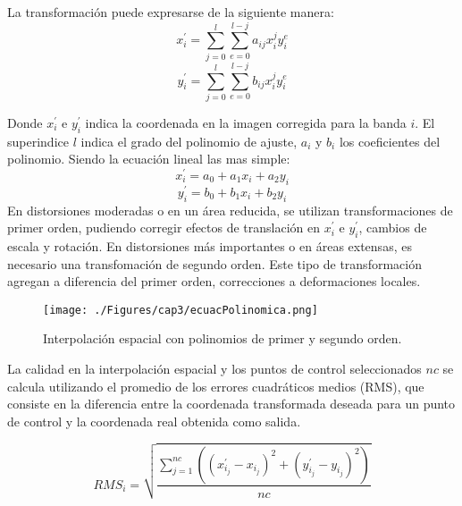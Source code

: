  La transformaci\'on puede expresarse de la siguiente manera:
	\begin{equation}
	x^{'}_{i} = \sum_{j=0}^{l} \sum_{e=0}^{l-j} a_{ij}x^{j}_{i}y^{e}_{i}
	\end{equation} 
		\begin{equation}
		y^{'}_{i} = \sum_{j=0}^{l} \sum_{e=0}^{l-j} b_{ij}x^{j}_{i}y^{e}_{i}
		\end{equation} 




Donde $ x^{'}_{i} $ e $ y^{'}_{i} $ indica la coordenada en la imagen corregida para la banda $ i $. El superindice $ l $ indica el grado del polinomio de ajuste, $ a_{i} $ y $ b_{i} $ los coeficientes del polinomio. Siendo la ecuaci\'on lineal las mas simple:
	\begin{equation}
	x^{'}_{i} = a_{0}+a_{1}x_{i}+a_{2}y_{i}
	\end{equation} 
		\begin{equation}
		y^{'}_{i} = b_{0}+b_{1}x_{i}+b_{2}y_{i}
		\end{equation} 
En distorsiones moderadas o en un \'area reducida, se utilizan transformaciones de primer orden, pudiendo corregir efectos de translaci\'on en $ x^{'}_{i} $ e $ y^{'}_{i} $, cambios de escala y rotaci\'on.
En distorsiones m\'as importantes o en \'areas extensas, es necesario una transfomaci\'on de segundo orden. Este tipo de transformaci\'on agregan a diferencia del primer orden, correcciones a deformaciones locales.
    \begin{figure}[H]
    	\centering
    	\texttt{[image: ./Figures/cap3/ecuacPolinomica.png]}
    	\caption{Interpolaci\'on espacial con polinomios de primer y segundo orden.}
    	\label{fig:intPolEcua}
    \end{figure}
 La calidad en la interpolaci\'on espacial y los puntos de control seleccionados $ nc $ se calcula utilizando el promedio de los errores cuadráticos medios (RMS), que consiste en la diferencia entre la coordenada transformada deseada para un punto de control y la coordenada real obtenida como salida.

 \begin{equation}
 RMS_{i} = \sqrt{\dfrac{\sum_{j=1}^{nc} ((x_{i_{j}}^{'}-x_{i_{j}})^{2}+(y_{i_{j}}^{'}-y_{i_{j}})^{2})}{nc}}
 \end{equation} 

